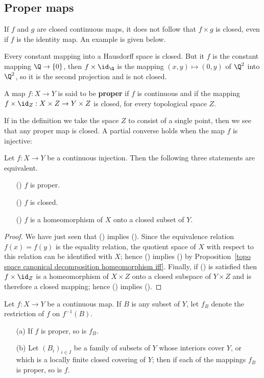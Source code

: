 \subsection{Proper maps}
If $f$ and $g$ are closed continuous maps, it does not follow that $f\times g$ is closed, even if $f$ is the identity map. An example is given below.
\begin{example}
Every constant mapping into a Hausdorff space is closed. But it $f$ is the constant mapping $\Q\to\{0\}$, then $f\times\id_\Q$ is the mapping $(x,y)\mapsto(0,y)$ of $\Q^2$ into $\Q^2$, so it is the second projection and is not closed.
\end{example}
\begin{definition}
A map $f:X\to Y$ is said to be \textbf{proper} if $f$ is continuous and if the mapping $f\times\id_Z:X\times Z\to Y\times Z$ is closed, for every topological space $Z$.
\end{definition}
If in the definition we take the space $Z$ to consist of a single point, then we see that any proper map is closed. A partial converse holds when the map $f$ is injective:
\begin{proposition}\label{topo space injection proper iff}
Let $f:X\to Y$ be a continuous injection. Then the following three statements are equivalent.
\begin{itemize}
\item[(\rmnum{1})] $f$ is proper.
\item[(\rmnum{2})] $f$ is closed.
\item[(\rmnum{3})] $f$ is a homeomorphism of $X$ onto a closed subset of $Y$.
\end{itemize}
\end{proposition}
\begin{proof}
We have just seen that () implies (). Since the equivalence relation $f(x)=f(y)$ is the equality relation, the quotient space of $X$ with respect to this relation can be identified with $X$; hence () implies () by Proposition~\ref{topo space canonical decomposition homeomorphism iff}. Finally, if () is satisfied then $f\times\id_Z$ is a homeomorphism of $X\times Z$ onto a closed subspace of $Y\times Z$ and is therefore a closed mapping; hence () implies ().
\end{proof}
\begin{proposition}\label{topo space proper map on subspace}
Let $f:X\to Y$ be a continuous map. If $B$ is any subset of $Y$, let $f_B$ denote the restriction of $f$ on $f^{-1}(B)$.
\begin{itemize}
\item[(a)] If $f$ is proper, so is $f_B$.
\item[(b)] Let $(B_i)_{i\in I}$ be a family of subsets of $Y$ whose interiors cover $Y$, or which is a locally finite closed covering of $Y$; then if each of the mappings $f_B$ is proper, so is $f$.
\end{itemize}
\end{proposition}
